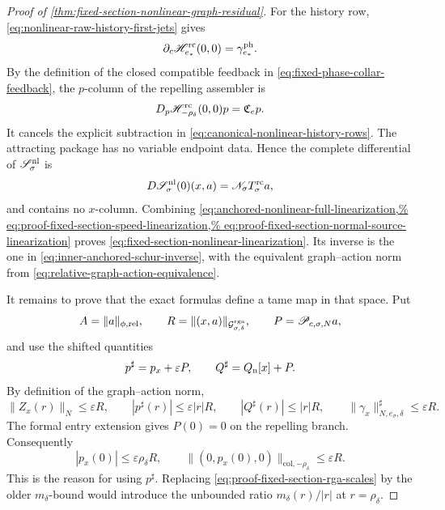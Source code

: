 \begin{proof}[Proof of
\cref{thm:fixed-section-nonlinear-graph-residual}]
For the history row,
\cref{eq:nonlinear-raw-history-first-jets} gives
\[
 \partial_c\mathscr H_{e_*}^{\rm rc}(0,0)
       =\gamma_{e_*}^{\rm ph}.
\]
By the definition of the closed compatible feedback in
\cref{eq:fixed-phase-collar-feedback}, the \(p\)-column of the repelling
assembler is
\[
 D_p\mathscr H_{-\rho_\delta}^{\rm rc}(0,0)p
       =\mathfrak C_ep.
\]
It cancels the explicit subtraction in
\cref{eq:canonical-nonlinear-history-rows}.  The attracting package has no
variable endpoint data.  Hence the complete differential of
\(\mathscr S_\sigma^{\rm nl}\) is
\begin{equation}
 D\mathscr S_\sigma^{\rm nl}(0)(x,a)
       =\mathscr N_\sigma T_\sigma^{\rm rc}a,     \label{eq:proof-fixed-section-normal-source-linearization}
\end{equation}
and contains no \(x\)-column.  Combining
\cref{eq:anchored-nonlinear-full-linearization,%
eq:proof-fixed-section-speed-linearization,%
eq:proof-fixed-section-normal-source-linearization}
proves \cref{eq:fixed-section-nonlinear-linearization}.  Its inverse is
the one in
\cref{eq:inner-anchored-schur-inverse}, with the equivalent graph--action
norm from \cref{eq:relative-graph-action-equivalence}.

It remains to prove that the exact formulas define a tame map in that
space.  Put
\[
 A=\|a\|_{\phi,\mathrm{rel}},\qquad
 R=\|(x,a)\|_{\mathcal G_{\sigma,\delta}^{\rm rga}},
 \qquad P=\mathscr P_{c,\sigma,N}a,
\]
and use the shifted quantities
\[
 p^\sharp=p_x+\varepsilon P,\qquad
 Q^\sharp=Q_{\rm n}[x]+P.
\]
By definition of the graph--action norm,
\begin{equation}
 \|Z_x(r)\|_N\le\varepsilon R,\qquad
 |p^\sharp(r)|\le\varepsilon|r|R,\qquad
 |Q^\sharp(r)|\le|r|R,\qquad
 \|\gamma_x\|_{N,e_\sigma,\delta}^\sharp
       \le\varepsilon R.                         \label{eq:proof-fixed-section-rga-scales}
\end{equation}
The formal entry extension gives \(P(0)=0\) on the repelling branch.
Consequently
\begin{equation}
 |p_x(0)|\le\varepsilon\rho_\delta R,\qquad
 \|(0,p_x(0),0)\|_{\mathrm{col},-\rho_\delta}
       \le\varepsilon R.                         \label{eq:proof-fixed-section-repelling-data-scale}
\end{equation}
This is the reason for using \(p^\sharp\).  Replacing
\cref{eq:proof-fixed-section-rga-scales} by the older
\(m_\delta\)-bound would introduce the unbounded ratio
\(m_\delta(r)/|r|\) at \(r=\rho_\delta\).


\end{proof}

